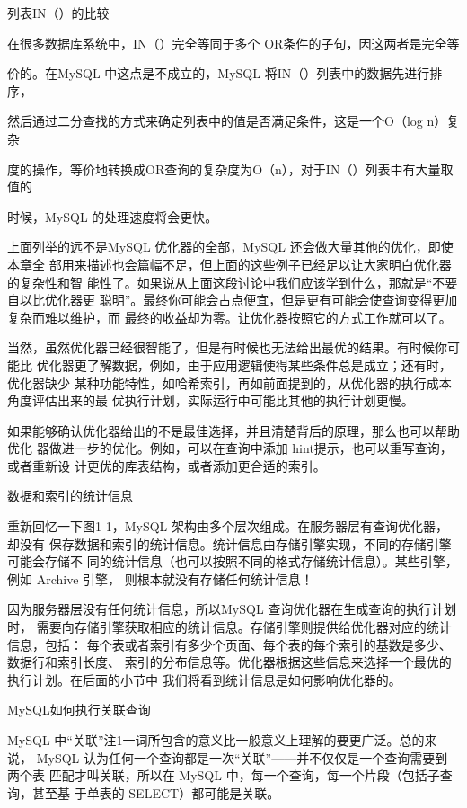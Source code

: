 列表IN（）的比较

在很多数据库系统中，IN（）完全等同于多个 OR条件的子句，因这两者是完全等

价的。在MySQL 中这点是不成立的，MySQL 将IN（）列表中的数据先进行排序，

然后通过二分查找的方式来确定列表中的值是否满足条件，这是一个O（log n）复杂

度的操作，等价地转换成OR查询的复杂度为O（n），对于IN（）列表中有大量取值的

时候，MySQL 的处理速度将会更快。

上面列举的远不是MySQL 优化器的全部，MySQL 还会做大量其他的优化，即使本章全
部用来描述也会篇幅不足，但上面的这些例子已经足以让大家明白优化器的复杂性和智
能性了。如果说从上面这段讨论中我们应该学到什么，那就是“不要自以比优化器更
聪明”。最终你可能会占点便宜，但是更有可能会使查询变得更加复杂而难以维护，而
最终的收益却为零。让优化器按照它的方式工作就可以了。

当然，虽然优化器已经很智能了，但是有时候也无法给出最优的结果。有时候你可能比
优化器更了解数据，例如，由于应用逻辑使得某些条件总是成立；还有时，优化器缺少
某种功能特性，如哈希索引，再如前面提到的，从优化器的执行成本角度评估出来的最
优执行计划，实际运行中可能比其他的执行计划更慢。

如果能够确认优化器给出的不是最佳选择，并且清楚背后的原理，那么也可以帮助优化
器做进一步的优化。例如，可以在查询中添加 hint提示，也可以重写查询，或者重新设
计更优的库表结构，或者添加更合适的索引。

数据和索引的统计信息

重新回忆一下图1-1，MySQL 架构由多个层次组成。在服务器层有查询优化器，却没有
保存数据和索引的统计信息。统计信息由存储引擎实现，不同的存储引擎可能会存储不
同的统计信息（也可以按照不同的格式存储统计信息）。某些引擎，例如 Archive 引擎，
则根本就没有存储任何统计信息！

因为服务器层没有任何统计信息，所以MySQL 查询优化器在生成查询的执行计划时，
需要向存储引擎获取相应的统计信息。存储引擎则提供给优化器对应的统计信息，包括：
每个表或者索引有多少个页面、每个表的每个索引的基数是多少、数据行和索引长度、
索引的分布信息等。优化器根据这些信息来选择一个最优的执行计划。在后面的小节中
我们将看到统计信息是如何影响优化器的。

MySQL如何执行关联查询

MySQL 中“关联”注1一词所包含的意义比一般意义上理解的要更广泛。总的来说，
MySQL 认为任何一个查询都是一次“关联”——并不仅仅是一个查询需要到两个表
匹配才叫关联，所以在 MySQL 中，每一个查询，每一个片段（包括子查询，甚至基
于单表的 SELECT）都可能是关联。

